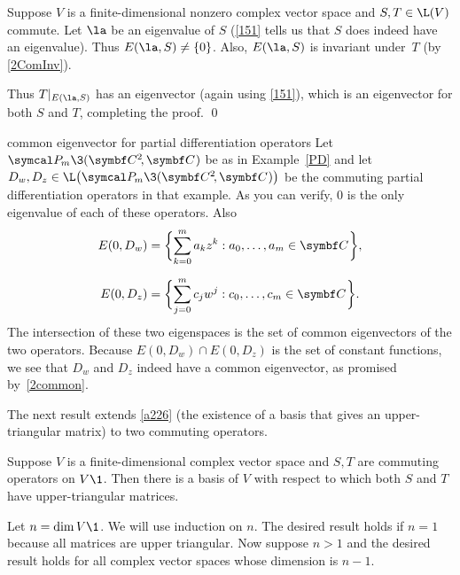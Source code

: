 \proof
Suppose $V$ is a  finite-dimensional nonzero complex vector space and $S, T \in \L(V)$ commute. Let $\la$ be an eigenvalue of $S$ (\ref{151} tells us that $S$ does indeed have an eigenvalue). Thus $E(\la, S) \ne \br{0}$. Also, $E(\la, S)$ is invariant under~$T$
(by \ref{2ComInv}).

Thus $T|_{E(\la, S)}$ has an eigenvector (again using \ref{151}), which is an eigenvector for both $S$ and $T$, completing the proof.
\qed

\begin{example}{common eigenvector for partial differentiation operators}
Let $\P\!_m\3(\CC2, \C{})$ be as in Example~\ref{PD} and let
$D_w, D_z \in \L\paren[\big]{\P\!_m\3(\CC2, \C{})}$ be the commuting partial differentiation operators in that example. As you can verify, $0$ is the only eigenvalue of each of these operators. Also
\begin{align*}
E(0, D_w) &= \br[\bigg]{ \sum_{k=0}^m a_k z^k: a_0, \ldots, a_m \in \C{}}, \\[6bp]
E(0, D_z) &= \br[\bigg]{ \sum_{j=0}^m c_j w^j: c_0, \ldots, c_m \in \C{}}.
\end{align*}
The intersection of these two eigenspaces is the set of common eigenvectors of the two operators. Because
$E(0, D_w) \cap E(0, D_z)$ is the set of constant functions, we see that $D_w$ and $D_z$ indeed have a common eigenvector, as promised by~\ref{2common}.
\end{example}

\pagebreak[2]

The next result extends \ref{a226} (the existence of a basis that gives an upper-triangular matrix) to two commuting operators.

{Suppose $V$ is a finite-dimensional complex vector space and $S, T$ are \mbox{commuting} operators on $V\1$. Then there is a basis of $V$ with respect to which both $S$ and $T$ have upper-triangular matrices.}

\proof
Let $n = \dim V\1$. We will use induction on $n$. The desired result holds if $n = 1$ because all  matrices are upper triangular.
Now suppose $n > 1$ and the desired result holds for all complex vector spaces whose dimension is $n-1$.

